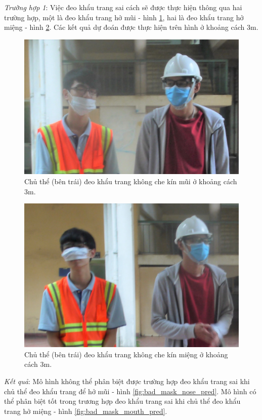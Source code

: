 \emph{Trường hợp 1}: Việc đeo khẩu trang sai cách sẽ được thực hiện thông qua hai trường hợp, một là đeo khẩu trang hở mũi - hình \ref{fig:bad_mask_nose}, hai là đeo khẩu trang hở miệng - hình \ref{fig:bad_mask_mouth}. Các kết quả dự đoán được thực hiện trên hình ở khoảng cách $3$m.
\begin{figure}[ht!]
	\centerline{\includegraphics[scale=0.7]{images/bad_mask_nose.jpg}}
  	\caption{Chủ thể (bên trái) đeo khẩu trang không che kín mũi ở khoảng cách 3m.}
  	\label{fig:bad_mask_nose}
\end{figure}
\begin{figure}[ht!]
	\centerline{\includegraphics[scale=0.65]{images/bad_mask_mouth.jpg}}
  	\caption{Chủ thể (bên trái) đeo khẩu trang không che kín miệng ở khoảng cách 3m.}
  	\label{fig:bad_mask_mouth}
\end{figure}
\emph{Kết quả}: Mô hình không thể phân biệt được trường hợp đeo khẩu trang sai khi chủ thể đeo khẩu trang để hở mũi - hình \ref{fig:bad_mask_nose_pred}. Mô hình có thể phân biệt tốt trong trương hợp đeo khẩu trang sai khi chủ thể đeo khẩu trang hở miệng - hình \ref{fig:bad_mask_mouth_pred}.

